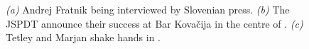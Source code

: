 \begin{figure}[t!]
    \vspace{0.3cm}
    \begin{subfigure}[t]{\textwidth}
    \centering
        \caption{} \label{marjan handshake}
    \end{subfigure}
    \caption{
    \textit{(a)} Andrej Fratnik being interviewed by Slovenian press. 
    \textit{(b)} The JSPDT announce their success at Bar Kovačija in the centre of . 
    \textit{(c)} Tetley and Marjan shake hands in . }
\end{figure}
